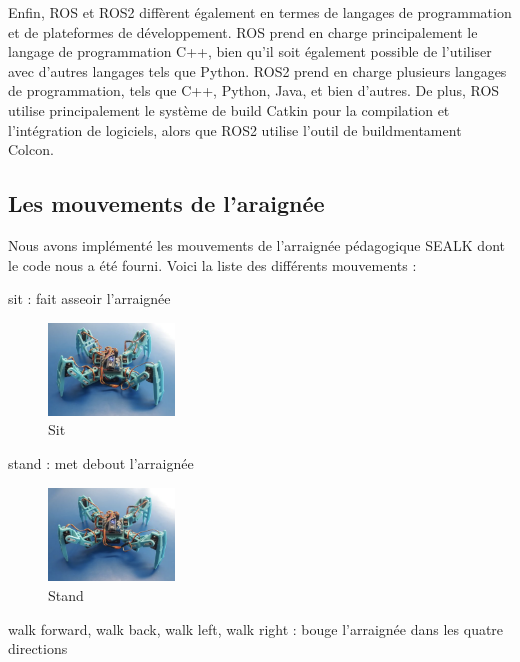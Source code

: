 Enfin, ROS et ROS2 diffèrent également en termes de langages de programmation et de plateformes de développement. 
ROS prend en charge principalement le langage de programmation C++, bien qu'il soit également possible de l'utiliser avec d'autres 
langages tels que Python. ROS2 prend en charge plusieurs langages de programmation, tels que C++, Python, Java, et bien d'autres. 
De plus, ROS utilise principalement le système de build Catkin pour la compilation et l'intégration de logiciels, alors que 
ROS2 utilise l'outil de buildmentament Colcon. 

			\subsection{Les mouvements de l'araignée}
			\label{les_mouvements}

Nous avons implémenté les mouvements de l'arraignée pédagogique SEALK dont le code nous a été fourni. Voici la liste des différents mouvements :	

sit : fait asseoir l'arraignée

\begin{figure}[H]
	\begin{center}
		\includegraphics[width=0.3\textwidth]{./img/sit}
		\caption{Sit}
	\end{center}
\end{figure}

stand : met debout l'arraignée

\begin{figure}[H]
	\begin{center}
		\includegraphics[width=0.3\textwidth]{./img/stand}
		\caption{Stand}
	\end{center}
\end{figure}

walk forward, walk back, walk left, walk right : bouge l'arraignée dans les quatre directions

